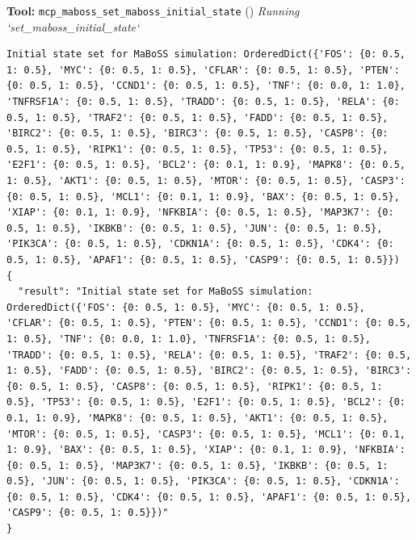 \documentclass[11pt,a4paper]{article}
\begin{document}
\begin{toolokbox}
\textbf{Tool:} \texttt{mcp\_maboss\_set\_maboss\_initial\_state} (\checkmark)
\textit{Running `set\_maboss\_initial\_state`}
\begin{lstlisting}
Initial state set for MaBoSS simulation: OrderedDict({'FOS': {0: 0.5, 1: 0.5}, 'MYC': {0: 0.5, 1: 0.5}, 'CFLAR': {0: 0.5, 1: 0.5}, 'PTEN': {0: 0.5, 1: 0.5}, 'CCND1': {0: 0.5, 1: 0.5}, 'TNF': {0: 0.0, 1: 1.0}, 'TNFRSF1A': {0: 0.5, 1: 0.5}, 'TRADD': {0: 0.5, 1: 0.5}, 'RELA': {0: 0.5, 1: 0.5}, 'TRAF2': {0: 0.5, 1: 0.5}, 'FADD': {0: 0.5, 1: 0.5}, 'BIRC2': {0: 0.5, 1: 0.5}, 'BIRC3': {0: 0.5, 1: 0.5}, 'CASP8': {0: 0.5, 1: 0.5}, 'RIPK1': {0: 0.5, 1: 0.5}, 'TP53': {0: 0.5, 1: 0.5}, 'E2F1': {0: 0.5, 1: 0.5}, 'BCL2': {0: 0.1, 1: 0.9}, 'MAPK8': {0: 0.5, 1: 0.5}, 'AKT1': {0: 0.5, 1: 0.5}, 'MTOR': {0: 0.5, 1: 0.5}, 'CASP3': {0: 0.5, 1: 0.5}, 'MCL1': {0: 0.1, 1: 0.9}, 'BAX': {0: 0.5, 1: 0.5}, 'XIAP': {0: 0.1, 1: 0.9}, 'NFKBIA': {0: 0.5, 1: 0.5}, 'MAP3K7': {0: 0.5, 1: 0.5}, 'IKBKB': {0: 0.5, 1: 0.5}, 'JUN': {0: 0.5, 1: 0.5}, 'PIK3CA': {0: 0.5, 1: 0.5}, 'CDKN1A': {0: 0.5, 1: 0.5}, 'CDK4': {0: 0.5, 1: 0.5}, 'APAF1': {0: 0.5, 1: 0.5}, 'CASP9': {0: 0.5, 1: 0.5}})
{
  "result": "Initial state set for MaBoSS simulation: OrderedDict({'FOS': {0: 0.5, 1: 0.5}, 'MYC': {0: 0.5, 1: 0.5}, 'CFLAR': {0: 0.5, 1: 0.5}, 'PTEN': {0: 0.5, 1: 0.5}, 'CCND1': {0: 0.5, 1: 0.5}, 'TNF': {0: 0.0, 1: 1.0}, 'TNFRSF1A': {0: 0.5, 1: 0.5}, 'TRADD': {0: 0.5, 1: 0.5}, 'RELA': {0: 0.5, 1: 0.5}, 'TRAF2': {0: 0.5, 1: 0.5}, 'FADD': {0: 0.5, 1: 0.5}, 'BIRC2': {0: 0.5, 1: 0.5}, 'BIRC3': {0: 0.5, 1: 0.5}, 'CASP8': {0: 0.5, 1: 0.5}, 'RIPK1': {0: 0.5, 1: 0.5}, 'TP53': {0: 0.5, 1: 0.5}, 'E2F1': {0: 0.5, 1: 0.5}, 'BCL2': {0: 0.1, 1: 0.9}, 'MAPK8': {0: 0.5, 1: 0.5}, 'AKT1': {0: 0.5, 1: 0.5}, 'MTOR': {0: 0.5, 1: 0.5}, 'CASP3': {0: 0.5, 1: 0.5}, 'MCL1': {0: 0.1, 1: 0.9}, 'BAX': {0: 0.5, 1: 0.5}, 'XIAP': {0: 0.1, 1: 0.9}, 'NFKBIA': {0: 0.5, 1: 0.5}, 'MAP3K7': {0: 0.5, 1: 0.5}, 'IKBKB': {0: 0.5, 1: 0.5}, 'JUN': {0: 0.5, 1: 0.5}, 'PIK3CA': {0: 0.5, 1: 0.5}, 'CDKN1A': {0: 0.5, 1: 0.5}, 'CDK4': {0: 0.5, 1: 0.5}, 'APAF1': {0: 0.5, 1: 0.5}, 'CASP9': {0: 0.5, 1: 0.5}})"
}
\end{lstlisting}
\end{toolokbox}
\end{document}
